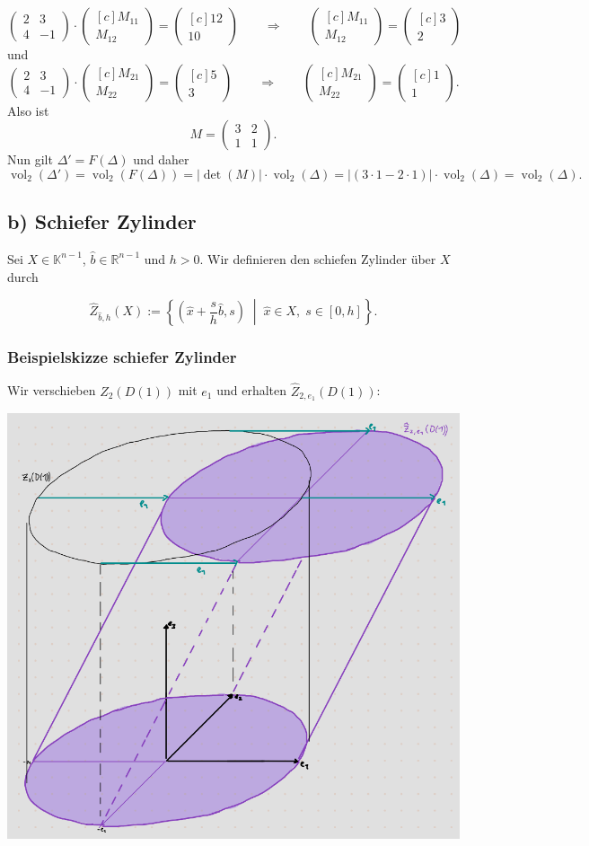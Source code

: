 \documentclass{article}
\newcommand{\imp}{\mathbb{\Rightarrow}}
\DeclareMathOperator{\vol}{vol}
\newcommand{\vect}[1]{\begin{pmatrix*}[c] #1 \end{pmatrix*}}
\newcommand{\legs}[2]{\left(\begin{array}{#1}#2\end{array}\right)}
\begin{document}
\[
  \legs{cc}{2 & 3 \\ 4 & -1} \cdot \vect{M_{11} \\ M_{12}}= \vect{12 \\ 10}
  \qquad\imp\qquad
  \vect{M_{11} \\ M_{12}} = \vect{3 \\ 2}
\]
und
\[
  \legs{cc}{2 & 3 \\ 4 & -1} \cdot \vect{M_{21} \\ M_{22}}= \vect{5 \\ 3}
  \qquad\imp\qquad
  \vect{M_{21} \\ M_{22}} = \vect{1 \\ 1}.
\]
Also ist
\[
  M = \legs{cc}{3 & 2 \\ 1 & 1}.
\]
Nun gilt $\Delta' = F(\Delta)$ und daher
\[
  \vol_2(\Delta') = \vol_2(F(\Delta)) = |\det(M)| \cdot \vol_2(\Delta)
  = |(3 \cdot 1 - 2 \cdot 1)| \cdot \vol_2(\Delta) = \vol_2(\Delta).
\]




\newpage
\subsection*{b) Schiefer Zylinder}

Sei \( X \in \mathbb{K}^{n-1} \), \( \hat{b} \in \mathbb{R}^{n-1} \) und \( h > 0 \). Wir definieren den schiefen Zylinder über \( X \) durch

\[
  \hat{Z}_{\hat{b},h}(X) := \left\{
  \left( \hat{x} + \frac{s}{h} \hat{b}, s \right) \; \middle| \; \hat{x} \in X, \; s \in [0, h]
  \right\}.
\]

\subsubsection*{Beispielskizze schiefer Zylinder}
Wir verschieben $Z_2(D(1))$ mit $e_1$ und erhalten $\hat{Z}_{2,e_1}(D(1))$:
\begin{center}
  \includegraphics[width=1\textwidth]{skizze.png}
\end{center}
\end{document}
